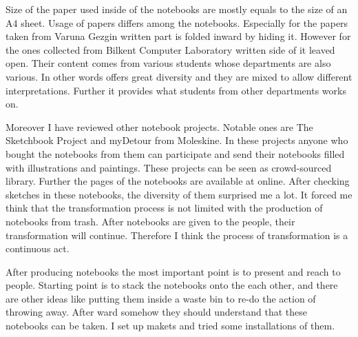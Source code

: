
Size of the paper used inside of the notebooks are mostly equals to the size of an A4 sheet. Usage of papers differs among the notebooks. Especially for the papers taken from Varuna Gezgin written part is folded inward by hiding it. However for the ones collected from Bilkent Computer Laboratory written side of it leaved open. Their content comes from various students whose departments are also various. In other words offers great diversity and they are mixed to allow different interpretations. Further it provides what students from other departments works on. %





Moreover I have reviewed other notebook projects. Notable ones are The Sketchbook Project and myDetour from Moleskine. In these projects anyone who bought the notebooks from them can participate and send their notebooks filled with illustrations and paintings. These projects can be seen as crowd-sourced library. Further the pages of the notebooks are available at online. After checking sketches in these notebooks, the diversity of them surprised me a lot. It forced me think that the transformation process is not limited with the production of notebooks from trash. After notebooks are given to the people, their transformation will continue. Therefore I think the process of transformation is a continuous act.





After producing notebooks the most important point is to present and reach to people. Starting point is to stack the notebooks onto the each other, and there are other ideas like putting them inside a waste bin to re-do the action of throwing away. After ward somehow they should understand that these notebooks can be taken. I set up makets and tried some installations of them.

